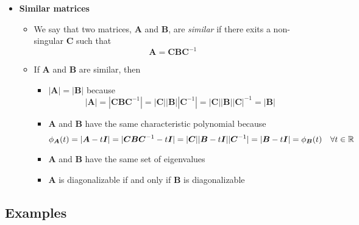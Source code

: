 \documentclass[12pt,a4paper]{article}
\begin{document}
\begin{itemize}
\item \textbf{Similar matrices}
  \begin{itemize}
  \item We say that two matrices, $\bm{A}$ and $\bm{B}$, are \emph{similar}
    if there exits a non-singular $\bm{C}$ such that
    \begin{equation}\nonumber%
      \bm{A} = \bm{C}\bm{B}\bm{C}^{-1}
    \end{equation}
  \item If $\bm{A}$ and $\bm{B}$ are similar, then
    \begin{itemize}
    \item $|\bm{A}| = |\bm{B}|$ because
      \begin{equation}\nonumber%
        |\bm{A}|
        =
        |\bm{C}\bm{B}\bm{C}^{-1}|
        =
        |\bm{C}||\bm{B}||\bm{C}^{-1}|
        =
        |\bm{C}||\bm{B}||\bm{C}|^{-1}
        = |\bm{B}|
      \end{equation}
    \item $\bm{A}$ and $\bm{B}$ have the same characteristic polynomial because
      \begin{equation}\nonumber%
        \phi_{\bm{A}}(t)
        = |\bm{A}-t\bm{I}|
        = |\bm{C}\bm{B}\bm{C}^{-1}-t\bm{I}|
        = |\bm{C}||\bm{B}-t\bm{I}||\bm{C}^{-1}|
        = |\bm{B}-t\bm{I}|
        =
        \phi_{\bm{B}}(t)
        \quad \forall t \in \R
      \end{equation}
    \item $\bm{A}$ and $\bm{B}$ have the same set of eigenvalues
    \item $\bm{A}$ is diagonalizable if and only if $\bm{B}$ is diagonalizable
    \end{itemize}

  \end{itemize}

\end{itemize}

\subsection{Examples}
\end{document}
